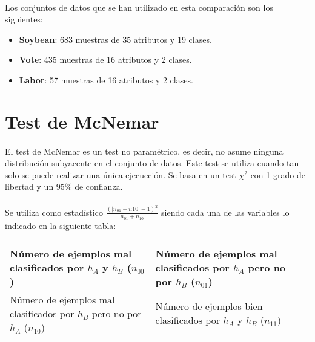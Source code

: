 \documentclass[10pt, a4paper,spanish]{article}
\begin{document}
		\paragraph{}
		Los conjuntos de datos que se han utilizado en esta comparación son los siguientes:

		\begin{itemize}
			\item \textbf{Soybean}: 683 muestras de 35 atributos y 19 clases.
			\item \textbf{Vote}: 435 muestras de 16 atributos y 2 clases.
			\item \textbf{Labor}: 57 muestras de 16 atributos y 2 clases.
		\end{itemize}

	\section{Test de McNemar}

		\paragraph{}
		El test de McNemar es un test no paramétrico, es decir, no asume ninguna distribución subyacente en el conjunto de datos. Este test se utiliza cuando tan solo se puede realizar una única ejecucción. Se basa en un test $\chi^2$ con 1 grado de libertad y un $95\%$ de confianza.

		\paragraph{}
		Se utiliza como estadístico $\frac{(|n_{01}-n{10}|-1)^2}{n_{01}+n_{10}}$  siendo cada una de las variables lo indicado en la siguiente tabla:

		\paragraph{}
		\begin{center}
			\begin{tabular}{ | p{6cm} | p{6cm} | }
				\hline
					Número de ejemplos mal clasificados por $h_A$  y $h_B$ ($n_{00}$) &
					Número de ejemplos mal clasificados por $h_A$  pero no por $h_B$ ($n_{01}$) \\ \hline

					Número de ejemplos mal clasificados por $h_B$ pero no por $h_A$ ($n_{10}$) &
					Número de ejemplos bien clasificados por $h_A$  y $h_B$ ($n_{11}$)\\
				\hline
			\end{tabular}
		\end{center}
\end{document}
